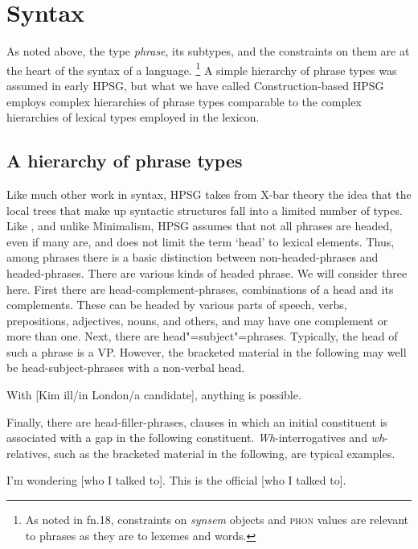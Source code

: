 \documentclass[output=paper
	        ,collection
	        ,collectionchapter
 	        ,biblatex
                ,babelshorthands
                ,newtxmath
                ,draftmode
                ,colorlinks, citecolor=brown
]{langscibook}
\begin{document}
\section{Syntax}

As noted above, the type \emph{phrase}, its subtypes, and the constraints on them are at the heart of the syntax of a language.%
%
\footnote{As noted in fn.18, constraints on \emph{synsem} objects and \textsc{phon} values are relevant to phrases as they are to lexemes and words.}
%
A simple hierarchy of phrase types was assumed in early HPSG, but what we have called Construction-based HPSG employs complex hierarchies of phrase types comparable to the complex hierarchies of lexical types employed in the lexicon.

\subsection{A hierarchy of phrase types}

Like much other work in syntax, HPSG takes from X-bar theory \citep{Jackendoff77a} the idea that the local trees that make up syntactic structures fall into a limited number of types. Like \citet{Jackendoff77a}, and unlike Minimalism, HPSG assumes that not all phrases are headed, even if many are, and does not limit the term ‘head’ to lexical elements. Thus, among phrases there is a basic distinction between non-headed-phrases and headed-phrases. There are various kinds of headed phrase. We will consider three here. First there are head-complement-phrases, combinations of a head and its complements. These can be headed by various parts of speech, verbs, prepositions, adjectives, nouns, and others, and may have one complement or more than one. Next, there are head"=subject"=phrases. Typically, the head of such a phrase is a VP. However, the bracketed material in the following may well be head-subject-phrases with a non-verbal head. 

\ea\label{ex:prop29}
With [Kim ill/in London/a candidate], anything is possible.
\z

Finally, there are head-filler-phrases, clauses in which an initial constituent is associated with a gap in the following constituent. \emph{Wh}-interrogatives and \emph{wh}-relatives, such as the bracketed material in the following, are typical examples.

\ea\label{ex:prop30}
	\ea I’m wondering [who I talked to].
	\ex This is the official [who I talked to].
	\z
\z
\end{document}
